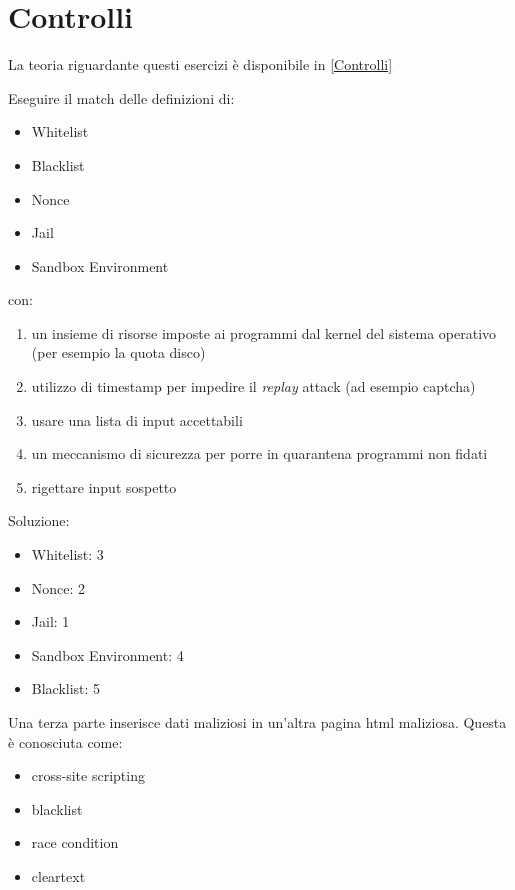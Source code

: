 \section{Controlli}
\label{es:Controlli}

La teoria riguardante questi esercizi è disponibile in \ref{Controlli}

\begin{Exercise} [
  title={Associa i termini},
  label={esControlli1}
  ]

  \Question Eseguire il match delle definizioni di:
\begin{itemize}
\item Whitelist
\item Blacklist
\item Nonce
\item Jail
\item Sandbox Environment
\end{itemize}
con:
\begin{enumerate}
 \item un insieme di risorse imposte ai programmi dal kernel del sistema 
operativo (per esempio la quota disco)
 \item utilizzo di timestamp per impedire il \textit{replay} attack (ad esempio 
captcha)
 \item usare una lista di input accettabili
 \item un meccanismo di sicurezza per porre in quarantena programmi non fidati
 \item rigettare input sospetto
\end{enumerate}

\end{Exercise}

\begin{Answer} [
  ref={esControlli1},
  number={1}
  ]

  \Question Soluzione:
\begin{itemize}
\item Whitelist: 3 
\item Nonce: 2
\item Jail: 1
\item Sandbox Environment: 4
\item Blacklist: 5

\end{itemize}

\end{Answer}



\begin{Exercise} [
  title={Quiz},
  label={esControlli2}
  ]

  \Question Una terza parte inserisce dati maliziosi in un'altra pagina html 
maliziosa. Questa è conosciuta come:
\begin{itemize}
\item cross-site scripting
\item blacklist
\item race condition
\item cleartext
\end{itemize}

\end{Exercise}

